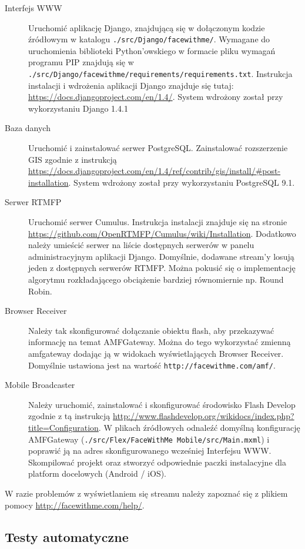 \begin{description}
    \item[Interfejs WWW] Uruchomić aplikację Django, znajdującą się w dołączonym kodzie źródłowym w katalogu \texttt{./src/Django/facewithme/}. Wymagane do uruchomienia biblioteki Python'owskiego w formacie pliku wymagań programu PIP znajdują się w \texttt{./src/Django/facewithme/requirements/requirements.txt}. Instrukcja instalacji i wdrożenia aplikacji Django znajduje się tutaj: \url{https://docs.djangoproject.com/en/1.4/}. System wdrożony został przy wykorzystaniu Django 1.4.1
    \item[Baza danych] Uruchomić i zainstalować serwer PostgreSQL. Zainstalować rozszerzenie GIS zgodnie z instrukcją \url{https://docs.djangoproject.com/en/1.4/ref/contrib/gis/install/#post-installation}. System wdrożony został przy wykorzystaniu PostgreSQL 9.1.
    \item[Serwer RTMFP] Uruchomić serwer  Cumulus. Instrukcja instalacji znajduje się na stronie \url{https://github.com/OpenRTMFP/Cumulus/wiki/Installation}. Dodatkowo należy umieścić serwer na liście dostępnych serwerów w panelu administracyjnym aplikacji Django. Domyślnie, dodawane stream'y losują jeden z dostępnych serwerów RTMFP. Można pokusić się o implementację algorytmu rozkładającego obciążenie bardziej równomiernie np. Round Robin.
    \item[Browser Receiver] Należy tak skonfigurować dołączanie obiektu flash, aby przekazywać informację na temat AMFGateway. Można do tego wykorzystać zmienną amfgateway dodając ją w widokach wyświetlających Browser Receiver. Domyślnie ustawiona jest na wartość \texttt{http://facewithme.com/amf/}.
    \item[Mobile Broadcaster] Należy uruchomić, zainstalować i skonfigurować środowisko Flash Develop zgodnie z tą instrukcją \url{http://www.flashdevelop.org/wikidocs/index.php?title=Configuration}. W plikach źródłowych odnaleźć domyślną konfigurację AMFGateway (\texttt{./src/Flex/FaceWithMe Mobile/src/Main.mxml}) i poprawić ją na adres skonfigurowanego wcześniej Interfejsu WWW. Skompilować projekt oraz stworzyć odpowiednie paczki instalacyjne dla platform docelowych (Android / iOS).
\end{description}

W razie problemów z wyświetlaniem się streamu należy zapoznać się z plikiem pomocy \url{http://facewithme.com/help/}.

\subsection{Testy automatyczne}

